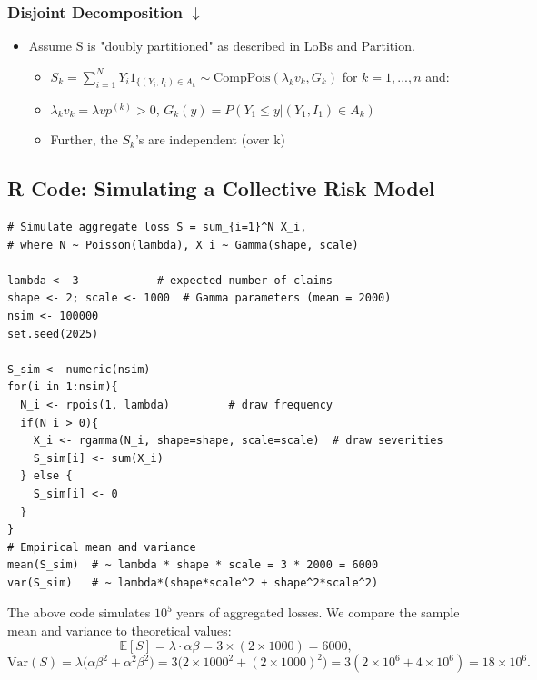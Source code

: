 \documentclass{article}
\begin{document}
\subsubsection{Disjoint Decomposition $\downarrow$}

\begin{itemize}
    \item Assume S is "doubly partitioned" as described in LoBs and Partition.
    \begin{itemize}
        \item $S_k = \sum_{i=1}^N Y_i 1_{\{(Y_i,I_i)\in A_k} \sim \text{CompPois}(\lambda_k v_k , G_k)$ \hspace{1cm} for $k = 1,...,n$ and:
        \item $\lambda_k v_k =\lambda v p ^{(k)} > 0$, \hspace{1cm} $G_k(y) = P(Y_1 \leq y| (Y_1, I_1) \in A_k)$
        \item Further, the $S_k$'s are independent (over k)
    \end{itemize}
\end{itemize}


\subsection{R Code: Simulating a Collective Risk Model}
\begin{lstlisting}
# Simulate aggregate loss S = sum_{i=1}^N X_i, 
# where N ~ Poisson(lambda), X_i ~ Gamma(shape, scale)

lambda <- 3            # expected number of claims
shape <- 2; scale <- 1000  # Gamma parameters (mean = 2000)
nsim <- 100000
set.seed(2025)

S_sim <- numeric(nsim)
for(i in 1:nsim){
  N_i <- rpois(1, lambda)         # draw frequency
  if(N_i > 0){
    X_i <- rgamma(N_i, shape=shape, scale=scale)  # draw severities
    S_sim[i] <- sum(X_i)
  } else {
    S_sim[i] <- 0
  }
}
# Empirical mean and variance
mean(S_sim)  # ~ lambda * shape * scale = 3 * 2000 = 6000
var(S_sim)   # ~ lambda*(shape*scale^2 + shape^2*scale^2) 
\end{lstlisting}
\noindent \noindent The above code simulates \(10^5\) years of aggregated losses. We compare the sample mean and variance to theoretical values:
\[
\mathbb{E}[S] = \lambda \cdot \alpha\beta = 3 \times (2 \times 1000) = 6000,
\]
\[
\mathrm{Var}(S) = \lambda\big(\alpha\beta^2 + \alpha^2 \beta^2\big) 
= 3\big(2\times1000^2 + (2\times1000)^2\big) = 3(2\times10^6 + 4\times10^6) = 18\times10^6.
\]
\end{document}
